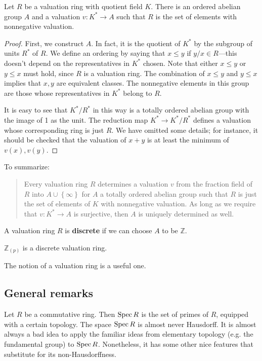 \begin{proposition}
Let $R$ be a valuation ring with quotient field $K$. There is an ordered
abelian group
$A$ and a valuation $v: K^* \to A$ such that $R$ is the set of elements with
nonnegative valuation.
\end{proposition}
\begin{proof}
First, we construct $A$. In fact, it is the quotient of $K^*$ by the subgroup
of units  $R^*$ of $R$.
We define an ordering by saying that $x \leq y$ if $y/x \in R$---this doesn't
depend on the representatives in $K^*$ chosen.  Note that either $x \leq y$ or
$y \leq x$ must hold, since $R$ is a valuation ring.
The combination of $ x \leq y$ and $y \leq x$ implies that $x,y$ are equivalent
classes.
The nonnegative elements in this group are those whose representatives in $K^*$
belong to $R$.

It is easy to see that $K^*/R^*$ in this way is a totally ordered abelian
group with
the image of 1 as the unit. The
reduction map $K^* \to K^*/R^*$  defines a valuation whose corresponding ring
is just $R$. We have omitted some details; for instance, it should be checked
that the valuation of $x+y$ is at least the minimum of $v(x), v(y)$.
\end{proof}



To summarize:
\begin{quote}
Every valuation ring $R$ determines a valuation $v$ from the fraction field of
$R$ into $A \cup \left\{\infty\right\}$ for $A$ a totally ordered abelian group
such that $R$ is just the set of elements of $K$ with nonnegative valuation. As
long as we require that $v: K^* \to A$ is surjective, then $A$ is uniquely
determined as well.
\end{quote}

\begin{definition}
A valuation ring $R$ is \textbf{discrete} if we can choose $A$ to be
$\mathbb{Z}$.
\end{definition}

\begin{example}
$\mathbb{Z}_{(p)}$ is a discrete valuation ring.
\end{example}

The notion of a valuation ring is a useful one.

\subsection{General remarks}
Let $R$ be a commutative ring. Then $\operatorname{Spec} R$ is the set of primes of $R$,
equipped
with a certain topology. The space $\operatorname{Spec} R$ is almost never Hausdorff. It is
almost always a bad idea to apply the familiar ideas from elementary topology
(e.g. the fundamental group) to $\operatorname{Spec} R$. Nonetheless, it has some other nice
features that substitute for its non-Hausdorffness.

